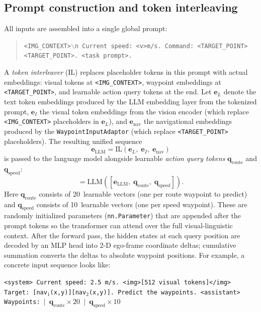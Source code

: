 \subsection{Prompt construction and token interleaving}
\label{sec:prompt-construction}
All inputs are assembled into a single global prompt:
\begin{quote}
\texttt{<IMG\_CONTEXT>$\backslash$n Current speed: <v>m/s. Command: <TARGET\_POINT><TARGET\_POINT>. <task prompt>.}
\end{quote}
A \emph{token interleaver} (IL) replaces placeholder tokens in this prompt with actual embeddings: visual tokens at \texttt{<IMG\_CONTEXT>}, waypoint embeddings at \texttt{<TARGET\_POINT>}, and learnable action query tokens at the end. Let $\mathbf{e}_L$ denote the text token embeddings produced by the LLM embedding layer from the tokenized prompt, $\mathbf{e}_I$ the visual token embeddings from the vision encoder (which replace \texttt{<IMG\_CONTEXT>} placeholders in $\mathbf{e}_L$), and $\mathbf{e}_{\text{nav}}$ the navigational embeddings produced by the \texttt{WaypointInputAdaptor} (which replace \texttt{<TARGET\_POINT>} placeholders). The resulting unified sequence
\begin{equation}
  \mathbf{e}_{\text{LLM}} = \text{IL}(\mathbf{e}_L,\; \mathbf{e}_I,\; \mathbf{e}_{\text{nav}})
\end{equation}
is passed to the language model alongside learnable \emph{action query tokens} $\mathbf{q}_{\text{route}}$ and $\mathbf{q}_{\text{speed}}$:
\begin{equation}
  [\mathbf{o}_l,\; \mathbf{o}_{\text{route}},\; \mathbf{o}_{\text{speed}}] = \text{LLM}([\mathbf{e}_{\text{LLM}},\; \mathbf{q}_{\text{route}},\; \mathbf{q}_{\text{speed}}]).
\end{equation}
Here $\mathbf{q}_{\text{route}}$ consists of 20~learnable vectors (one per route waypoint to predict) and $\mathbf{q}_{\text{speed}}$ consists of 10~learnable vectors (one per speed waypoint). These are randomly initialized parameters (\texttt{nn.Parameter}) that are appended after the prompt tokens so the transformer can attend over the full visual-linguistic context. After the forward pass, the hidden states at each query position are decoded by an MLP head into 2-D ego-frame coordinate deltas; cumulative summation converts the deltas to absolute waypoint positions. For example, a concrete input sequence looks like:

\medskip
\noindent\texttt{\small <system> Current speed: 2.5\,m/s. <img>[512 visual tokens]</img> Target: [nav$_1$(x,y)][nav$_2$(x,y)]. Predict the waypoints. <assistant> Waypoints: $|$ $\mathbf{q}_{\text{route}} \times 20$ $|$ $\mathbf{q}_{\text{speed}} \times 10$}
\medskip

